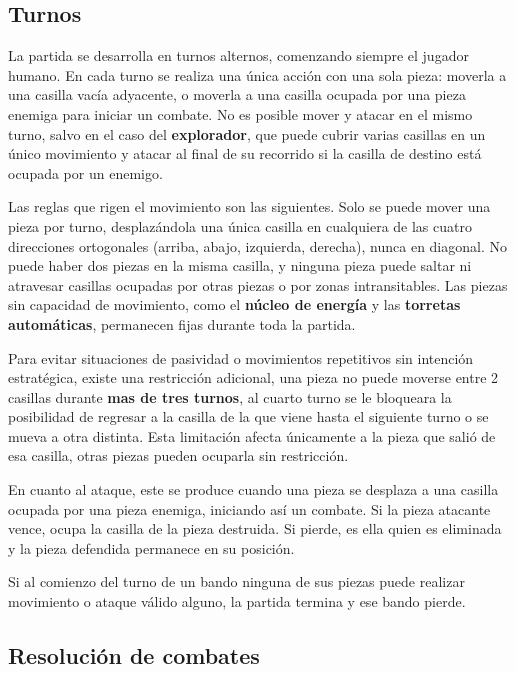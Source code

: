 \subsection{Turnos}

La partida se desarrolla en turnos alternos, comenzando siempre el jugador humano. En cada turno se realiza una única acción con una sola pieza: moverla a una casilla vacía adyacente, o moverla a una casilla ocupada por una pieza enemiga para iniciar un combate. No es posible mover y atacar en el mismo turno, salvo en el caso del \textbf{explorador}, que puede cubrir varias casillas en un único movimiento y atacar al final de su recorrido si la casilla de destino está ocupada por un enemigo.

Las reglas que rigen el movimiento son las siguientes. Solo se puede mover una pieza por turno, desplazándola una única casilla en cualquiera de las cuatro direcciones ortogonales (arriba, abajo, izquierda, derecha), nunca en diagonal. No puede haber dos piezas en la misma casilla, y ninguna pieza puede saltar ni atravesar casillas ocupadas por otras piezas o por zonas intransitables. Las  piezas sin capacidad de movimiento, como el \textbf{núcleo de energía} y las \textbf{torretas automáticas}, permanecen fijas durante toda la partida.

Para evitar situaciones de pasividad o movimientos repetitivos sin intención estratégica, existe una restricción adicional, una pieza no puede moverse entre 2 casillas durante \textbf{mas de tres turnos}, al cuarto turno se le bloqueara la posibilidad de regresar a la casilla de la que viene hasta el siguiente turno o se mueva a otra distinta. Esta limitación afecta únicamente a la pieza 
que salió de esa casilla, otras piezas pueden ocuparla sin restricción.

En cuanto al ataque, este se produce cuando una pieza se desplaza a una casilla ocupada por una pieza enemiga, iniciando así un combate. Si la pieza atacante vence, ocupa la casilla de la pieza destruida. Si pierde, es ella quien es eliminada y la pieza defendida permanece en su posición.

Si al comienzo del turno de un bando ninguna de sus piezas puede realizar movimiento o ataque válido alguno, la partida termina y ese bando pierde.

\subsection{Resolución de combates}

